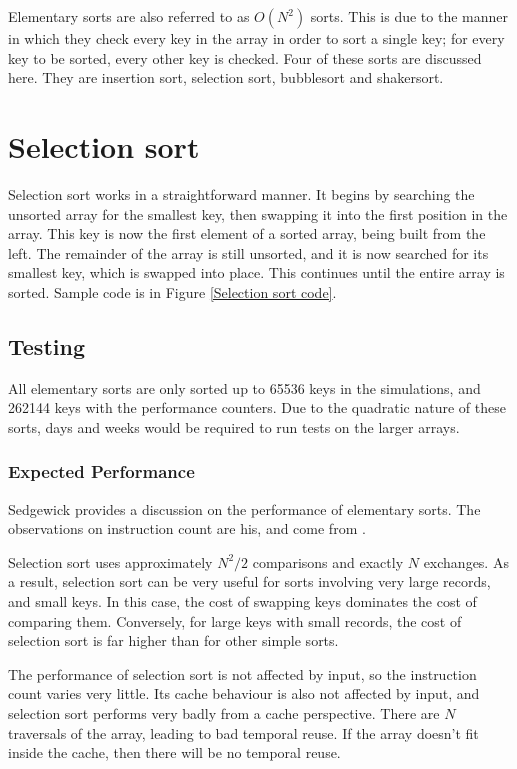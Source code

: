 \label{ordernsquared}
Elementary sorts are also referred to as $O(N^2)$ sorts. This is due to the
manner in which they check every key in the array in order to sort a single key;
for every key to be sorted, every other key is checked.  Four of these sorts are
discussed here. They are insertion sort, selection sort, bubblesort and
shakersort.

\section{Selection sort}

Selection sort works in a straightforward manner. It begins by 
searching the unsorted array for the smallest key, then swapping it into the
first position in the array. This key is now the first element of a sorted
array, being built from the left. The remainder of the array is
still unsorted, and it is now searched for its smallest key, which is swapped
into place. This continues until the entire array is sorted. Sample code is in
Figure \vref{Selection sort code}.

\subsection{Testing}
All elementary sorts are only sorted up to 65536 keys in the simulations, and
262144 keys with the performance counters. Due to the quadratic nature of
these sorts, days and weeks would be required to run tests on the larger arrays.

\subsubsection{Expected Performance}
Sedgewick provides a discussion on the performance of elementary sorts. The
observations on instruction count are his, and come from \cite{Sedgewick02}.

Selection sort uses approximately $N^2/2$ comparisons and exactly $N$ exchanges.
As a result, selection sort can be very useful for sorts involving very large
records, and small keys. In this case, the cost of swapping keys dominates the
cost of comparing them. Conversely, for large keys with small records, the cost
of selection sort is far higher than for other simple sorts.

The performance of selection sort is not affected by input, so the instruction
count varies very little.  Its cache behaviour is also not affected by input,
and selection sort performs very badly from a cache perspective. There are $N$
traversals of the array, leading to bad temporal reuse. If the array doesn't fit
inside the cache, then there will be no temporal reuse.

